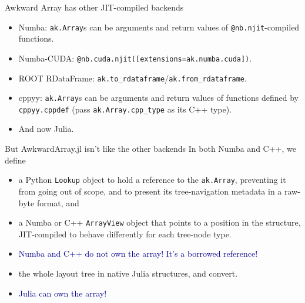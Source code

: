 \documentclass[aspectratio=169]{beamer}
\begin{document}
\begin{frame}{Awkward Array has other JIT-compiled backends}
\vspace{0.5 cm}
\large
\begin{itemize}\setlength{\itemsep}{0.5 cm}
\item<1-> Numba: \texttt{ak.Array}s can be arguments and return values of \texttt{@nb.njit}-compiled functions.
\item<2-> Numba-CUDA: \texttt{@nb.cuda.njit([extensions=ak.numba.cuda])}.
\item<3-> ROOT RDataFrame: \texttt{ak.to_rdataframe}/\texttt{ak.from_rdataframe}.
\item<4-> cppyy: \texttt{ak.Array}s can be arguments and return values of functions defined by \texttt{cppyy.cppdef} (pass \texttt{ak.Array.cpp_type} as its C++ type).
\item<5-> And now Julia.
\end{itemize}
\end{frame}

\begin{frame}{But AwkwardArray.jl isn't like the other backends}
\large
\vspace{0.3 cm}
In both Numba and C++, we define

\vspace{0.25 cm}
\begin{itemize}\setlength{\itemsep}{0.25 cm}
\item<1-> a Python \texttt{Lookup} object to hold a reference to the \texttt{ak.Array}, preventing it from going out of scope, and to present its tree-navigation metadata in a raw-byte format, and
\item<1-> a Numba or C++ \texttt{ArrayView} object that points to a position in the structure, JIT-compiled to behave differently for each tree-node type.
\item<2-> \textcolor{darkblue}{Numba and C++ do not own the array! It's a borrowed reference!}
\end{itemize}

\vspace{0.5 cm}

\vspace{0.25 cm}
\begin{itemize}\setlength{\itemsep}{0.25 cm}
\item<3-> the whole layout tree in native Julia structures, and convert.
\item<4-> \textcolor{darkblue}{Julia can own the array!}
\end{itemize}
\end{frame}
\end{document}
